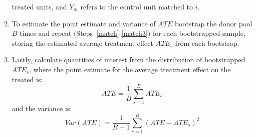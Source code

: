 \documentclass[11pt,titlepage]{article}
\begin{document}
\begin{enumerate}
treated units, and $Y_m$ refers to the control unit matched to $i$. 
\item To estimate the point estimate and variance of $ATE$ bootstrap the donor pool $B$ times
  and repeat (Steps~\ref{match}-\ref{match3}) for each bootstrapped sample, storing
  the estimated average treatment effect $ATE_s$ from each bootstrap. 
\item Lastly, calculate quantities of interest from the distribution
  of bootstrapped $ATE_s$, where the point estimate for the average
  treatment effect on the treated is:
\begin{equation}
    ATE = \frac{1}{B} \sum_{s=1}^{B} ATE_s
\end{equation}
and the variance is:
\begin{equation}
    Var(ATE)= \frac{1}{B-1} \sum_{s=1}^{B} (ATE-ATE_s)^2
\end{equation}
\end{enumerate}
\end{document}
